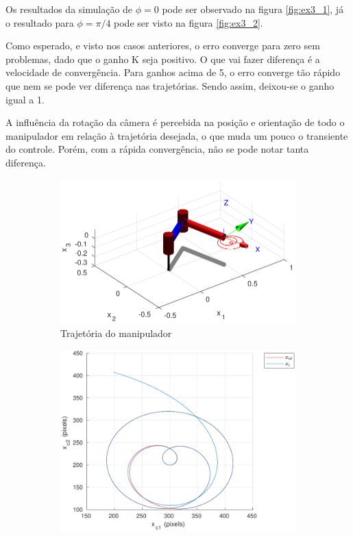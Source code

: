 \documentclass[a4paper,11pt]{article}
\theoremstyle{mytheor}
\begin{document}
Os resultados da simulação de $\phi = 0$ pode ser observado na figura \ref{fig:ex3_1}, já o resultado para $\phi = \pi/4$ pode ser visto na figura \ref{fig:ex3_2}.

Como esperado, e visto nos casos anteriores, o erro converge para zero sem problemas, dado que o ganho K seja positivo. O que vai fazer diferença é a velocidade de convergência. Para ganhos acima de 5, o erro converge tão rápido que nem se pode ver diferença nas trajetórias. Sendo assim, deixou-se o ganho igual a 1.

A influência da rotação da câmera é percebida na posição e orientação de todo o manipulador em relação à trajetória desejada, o que muda um pouco o transiente do controle. Porém, com a rápida convergência, não se pode notar tanta diferença.

\begin{figure}[ht]
\centering
  \begin{minipage}{\linewidth}
  \centering
    \begin{subfigure}[b]{0.55\textwidth}
    \includegraphics[width=1\textwidth]{figs/ex3_1_traj.pdf}
    \caption{Trajetória do manipulador}
    \label{fig:ex3_1_traj}
    \end{subfigure}
  \end{minipage}
  \begin{minipage}{\linewidth}
  \centering
    \begin{subfigure}[b]{0.49\textwidth}
    \includegraphics[width=1\textwidth]{figs/ex3_1_x_c.pdf}

\end{subfigure}
\end{minipage}
\end{figure}
\end{document}
